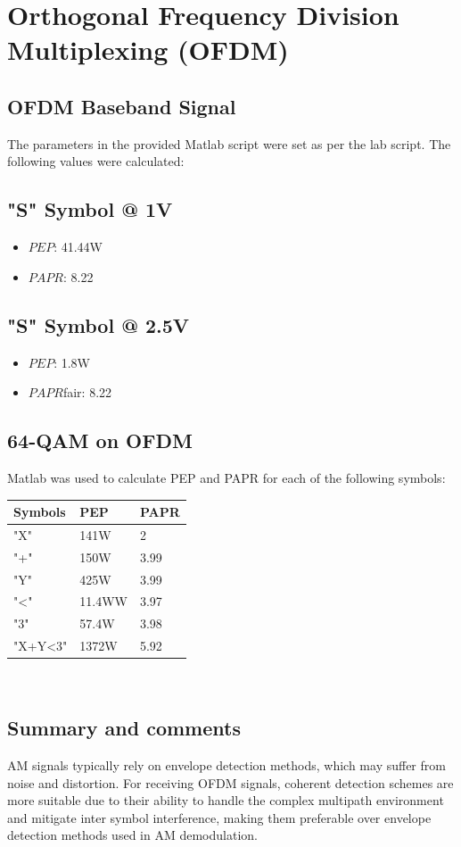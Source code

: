 \documentclass[a4paper]{article}
\begin{document}
        \section{Orthogonal Frequency Division Multiplexing (OFDM)}
        \subsection{OFDM Baseband Signal}
        The parameters in the provided Matlab script were set as per the lab script.
        The following values were calculated:
        \subsection*{"S" Symbol @ 1V}
        \begin{itemize}
            \item ${PEP}$: 41.44W
            \item ${PAPR}$: 8.22
        \end{itemize}

        \subsection*{"S" Symbol @ 2.5V}
        \begin{itemize}
            \item ${PEP}$: 1.8W
            \item ${PAPR}$fair: 8.22
        \end{itemize}

        \subsection{64-QAM on OFDM}
        Matlab was used to calculate PEP and PAPR for each of the following symbols:

        \begin{tabular}{|l|l|l|}
        \hline
        \textbf{Symbols} & \textbf{PEP} & \textbf{PAPR} \\ \hline
        "X" & 141W & 2 \\ \hline
        "+" & 150W & 3.99 \\ \hline
        "Y" & 425W & 3.99 \\ \hline
        "<" & 11.4WW & 3.97 \\ \hline
        "3" & 57.4W & 3.98 \\ \hline
        "X+Y<3" & 1372W & 5.92 \\ \hline
        \end{tabular} \\

        \subsection{Summary and comments}

        AM signals typically rely on envelope detection methods, which may suffer from noise and distortion. For receiving OFDM signals, coherent detection schemes are more suitable due to their ability to handle the complex multipath environment and mitigate inter symbol interference, making them preferable over envelope detection methods used in AM demodulation.

        
\end{document}
